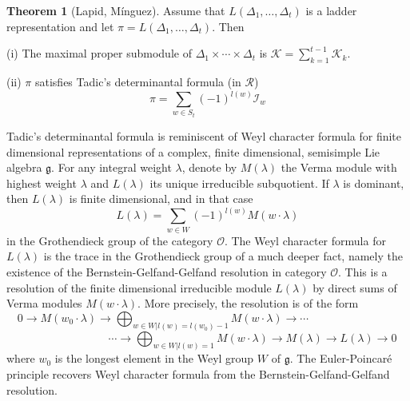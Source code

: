 \documentclass[a4paper,12pt,leqno]{amsart}
\newcommand{\frg}{\mathfrak{g}}
\newcommand{\caI}{\mathcal{I}}
\newcommand{\caK}{\mathcal{K}}
\newcommand{\caO}{\mathcal{O}}
\newcommand{\caR}{\mathcal{R}}
\theoremstyle{plain}
\theoremstyle{definition}
\theoremstyle{definition}
\newtheorem{thmLM}{Theorem}
\begin{document}
\begin{thmLM}[Lapid, M\'inguez]\label{LM} Assume that $L(\Delta_1,\ldots ,\Delta_t) $ is a ladder
representation
and let $\pi=L(\Delta_1,\ldots ,\Delta_t) $. Then

(i) The maximal proper submodule of $\Delta_1\times \cdots \times \Delta_t$ is $\caK=\sum_{k=1}^{t-1}\caK_k$.

(ii) $\pi$ satisfies Tadic's determinantal formula (in $\caR$)
\begin{equation} \pi=\sum_{w\in S_t} (-1)^{l(w)} \caI_w
\end{equation}
\end{thmLM}


Tadic's determinantal formula is reminiscent of Weyl character formula for finite dimensional
representations of a complex,  finite dimensional,   semisimple Lie algebra $\frg$. For any integral weight
$\lambda$, denote by  $M(\lambda)$ the Verma module with highest weight $\lambda$ and $L(\lambda)$
its unique irreducible subquotient.
If $\lambda$ is dominant, then $L(\lambda)$ is finite dimensional, and in that case
 \begin{equation*} L(\lambda)=\sum_{w\in W} (-1)^{l(w)} M(w\cdot \lambda)
\end{equation*}
in the Grothendieck group of the category $\caO$.
The Weyl character formula for $L(\lambda)$ is the trace in the Grothendieck group of a much deeper fact,
namely the existence  of the Bernstein-Gelfand-Gelfand resolution in category $\caO$. This is a resolution of
the finite dimensional irreducible module $L(\lambda)$ by direct sums of  Verma modules $M(w\cdot \lambda)$.
 More precisely, the resolution is of the form
\[ 0\rightarrow  M(w_0\cdot \lambda) \rightarrow \bigoplus_{w\in W\vert l(w)=l(w_0)-1} M(w\cdot \lambda)
 \rightarrow\cdots \qquad \qquad\qquad \qquad \]
 \[ \qquad \qquad\qquad \qquad\cdots  \rightarrow \bigoplus_{w\in W\vert l(w)=1}   M(w\cdot
 \lambda) \rightarrow
M(\lambda)\rightarrow L(\lambda)\rightarrow 0
\]
where $w_0$ is the longest element in the Weyl group $W$ of $\frg$.
The Euler-Poincaré principle recovers Weyl character formula from the  Bernstein-Gelfand-Gelfand resolution.
\end{document}
